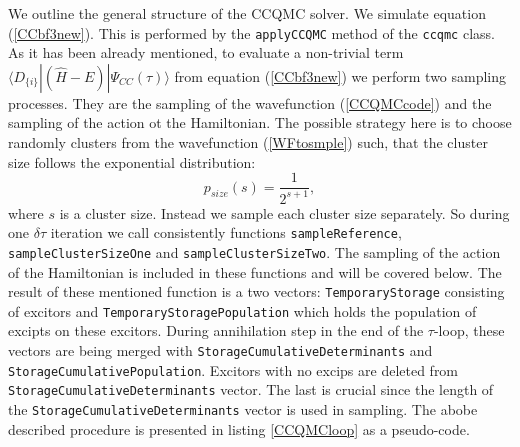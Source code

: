 \documentclass[twoside,english]{uiofysmaster}
\newcommand{\classname}[1]{\texttt{#1}}
\begin{document}
We outline the general structure of the CCQMC solver. 
We simulate equation (\ref{CCbf3new}). This is performed by the \classname{applyCCQMC} method of the \classname{ccqmc} class.
As it has been already mentioned, to evaluate a non-trivial term  $\langle D_{\{i\}}|(\hat{H}-E)|\Psi_{CC}(\tau)\rangle$ from equation (\ref{CCbf3new}) we perform two sampling processes. They are the sampling of the wavefunction (\ref{CCQMCcode}) and the sampling of the action ot the Hamiltonian. The possible strategy here is to choose randomly clusters from the wavefunction (\ref{WFtosmple}) such, that the cluster size follows the exponential distribution:
\begin{equation}\label{expdistrib}
p_{size}(s)=\frac{1}{2^{s+1}},
\end{equation}
where $s$ is a cluster size.
Instead we sample each cluster size separately. So during one $\delta\tau$ iteration we call consistently functions \classname{sampleReference}, \\ \classname{sampleClusterSizeOne} and \classname{sampleClusterSizeTwo}. The sampling of the action of the Hamiltonian is included in these functions and will be covered below. The result of these mentioned function is a two vectors: \classname{TemporaryStorage} consisting of excitors and \classname{TemporaryStoragePopulation} which holds the population of excipts on these excitors. During annihilation step in the end of the $\tau$-loop, these vectors are being merged with \classname{StorageCumulativeDeterminants} and \classname{StorageCumulativePopulation}. Excitors with no excips are deleted from \classname{StorageCumulativeDeterminants} vector. The last is crucial since the length of the \classname{StorageCumulativeDeterminants} vector is used in sampling. The abobe described procedure is presented in listing \ref{CCQMCloop} as a  pseudo-code.
\end{document}
